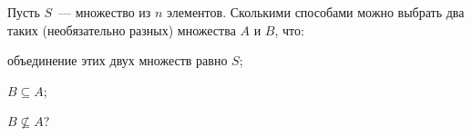 Пусть $S$~--- множество из $n$ элементов. Сколькими способами можно выбрать два таких (необязательно
разных) множества $A$ и $B$, что:
\begin{enumcyr}
    \item объединение этих двух множеств равно $S$;
    \item $B \subseteq A$;
    \item $B \nsubseteq A$?
\end{enumcyr}